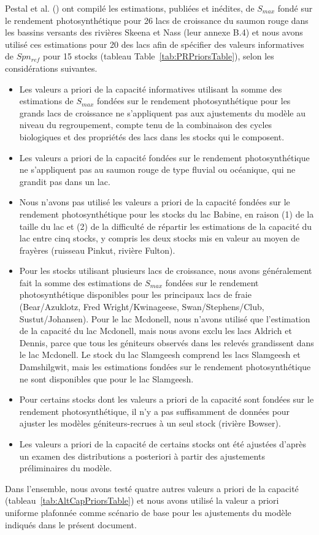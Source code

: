 \documentclass[french,11pt]{book}
\begin{document}
Pestal et al. () ont compilé les estimations, publiées et inédites, de \(S_{max}\) fondé sur le rendement photosynthétique pour 26 lacs de croissance du saumon rouge dans les bassins versants des rivières Skeena et Nass (leur annexe B.4) et nous avons utilisé ces estimations pour 20 des lacs afin de spécifier des valeurs informatives de \(Spn_{ref}\) pour 15 stocks (tableau Table~\ref{tab:PRPriorsTable}), selon les considérations suivantes.
\begin{itemize}

\item
  Les valeurs a priori de la capacité informatives utilisant la somme des estimations de \(S_{max}\) fondées sur le rendement photosynthétique pour les grands lacs de croissance ne s'appliquent pas aux ajustements du modèle au niveau du regroupement, compte tenu de la combinaison des cycles biologiques et des propriétés des lacs dans les stocks qui le composent.
\item
  Les valeurs a priori de la capacité fondées sur le rendement photosynthétique ne s'appliquent pas au saumon rouge de type fluvial ou océanique, qui ne grandit pas dans un lac.
\item
  Nous n'avons pas utilisé les valeurs a priori de la capacité fondées sur le rendement photosynthétique pour les stocks du lac Babine, en raison (1) de la taille du lac et (2) de la difficulté de répartir les estimations de la capacité du lac entre cinq stocks, y compris les deux stocks mis en valeur au moyen de frayères (ruisseau Pinkut, rivière Fulton).
\item
  Pour les stocks utilisant plusieurs lacs de croissance, nous avons généralement fait la somme des estimations de \(S_{max}\) fondées sur le rendement photosynthétique disponibles pour les principaux lacs de fraie (Bear/Azuklotz, Fred Wright/Kwinageese, Swan/Stephens/Club, Sustut/Johansen). Pour le lac Mcdonell, nous n'avons utilisé que l'estimation de la capacité du lac Mcdonell, mais nous avons exclu les lacs Aldrich et Dennis, parce que tous les géniteurs observés dans les relevés grandissent dans le lac Mcdonell. Le stock du lac Slamgeesh comprend les lacs Slamgeesh et Damshilgwit, mais les estimations fondées sur le rendement photosynthétique ne sont disponibles que pour le lac Slamgeesh.
\item
  Pour certains stocks dont les valeurs a priori de la capacité sont fondées sur le rendement photosynthétique, il n'y a pas suffisamment de données pour ajuster les modèles géniteurs-recrues à un seul stock (rivière Bowser).
\item
  Les valeurs a priori de la capacité de certains stocks ont été ajustées d'après un examen des distributions a posteriori à partir des ajustements préliminaires du modèle.
\end{itemize}
Dans l'ensemble, nous avons testé quatre autres valeurs a priori de la capacité (tableau~\ref{tab:AltCapPriorsTable}) et nous avons utilisé la valeur a priori uniforme plafonnée comme scénario de base pour les ajustements du modèle indiqués dans le présent document.
\end{document}
